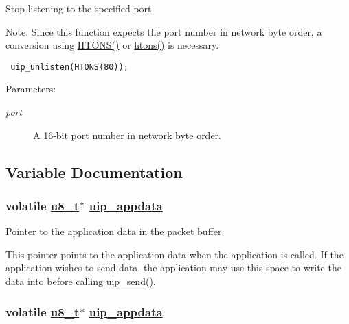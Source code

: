 Stop listening to the specified port. 

\begin{Desc}
\item[Note:]Since this function expects the port number in network byte order, a conversion using \hyperlink{a00065_g69a7a4951ff21b302267532c21ee78fc}{HTONS()} or \hyperlink{a00065_ga22b04cac8cf283ca12f028578bebc06}{htons()} is necessary.\end{Desc}


\footnotesize\begin{verbatim} uip_unlisten(HTONS(80)); 
\end{verbatim}
\normalsize


\begin{Desc}
\item[Parameters:]
\begin{description}
\item[{\em port}]A 16-bit port number in network byte order. \end{description}
\end{Desc}


\subsection{Variable Documentation}
\hypertarget{a00059_ge71ae1aa130be22a5f028e76d8d1e31e}{
\subsubsection[uip\_\-appdata]{\setlength{\rightskip}{0pt plus 5cm}volatile \hyperlink{a00070_ge081489b4906f65a3cb18e9fbe9f8d23}{u8\_\-t}$\ast$ \hyperlink{a00059_ge71ae1aa130be22a5f028e76d8d1e31e}{uip\_\-appdata}}}
\label{a00059_ge71ae1aa130be22a5f028e76d8d1e31e}


Pointer to the application data in the packet buffer. 

This pointer points to the application data when the application is called. If the application wishes to send data, the application may use this space to write the data into before calling \hyperlink{a00064_gb59415b2801e568f52bc1d86ef10e159}{uip\_\-send()}. \hypertarget{a00059_ge71ae1aa130be22a5f028e76d8d1e31e}{
\subsubsection[uip\_\-appdata]{\setlength{\rightskip}{0pt plus 5cm}volatile \hyperlink{a00070_ge081489b4906f65a3cb18e9fbe9f8d23}{u8\_\-t}$\ast$ \hyperlink{a00059_ge71ae1aa130be22a5f028e76d8d1e31e}{uip\_\-appdata}}}
\label{a00059_ge71ae1aa130be22a5f028e76d8d1e31e}


